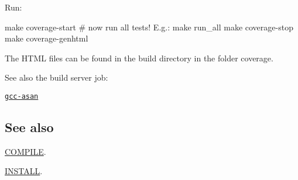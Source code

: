 Run\+: \begin{DoxyVerb}    make coverage-start
    # now run all tests! E.g.:
    make run_all
    make coverage-stop
    make coverage-genhtml
\end{DoxyVerb}


The H\+T\+ML files can be found in the build directory in the folder {\ttfamily coverage}.

See also the build server job\+:


\begin{DoxyItemize}
\item \href{https://build.libelektra.org/job/elektra-incremental/}{\tt gcc-\/asan}
\end{DoxyItemize}

\subsection*{See also}


\begin{DoxyItemize}
\item \hyperlink{doc_COMPILE_md}{C\+O\+M\+P\+I\+LE}.
\item \hyperlink{doc_INSTALL_md}{I\+N\+S\+T\+A\+LL}. 
\end{DoxyItemize}